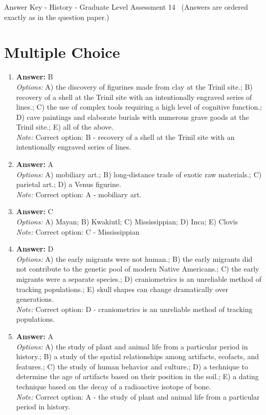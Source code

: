 \documentclass[12pt]{article}
\begin{document}
\begin{center}
Answer Key - History - Graduate Level Assessment 14 \
\small (Answers are ordered exactly as in the question paper.)
\end{center}

\section*{Multiple Choice}
\begin{enumerate}[label=\arabic*.]
\item \textbf{Answer:} B
\\ \textit{Options:} A) the discovery of figurines made from clay at the Trinil site.; B) recovery of a shell at the Trinil site with an intentionally engraved series of lines.; C) the use of complex tools requiring a high level of cognitive function.; D) cave paintings and elaborate burials with numerous grave goods at the Trinil site.; E) all of the above.
\\ \textit{Note:} Correct option: B - recovery of a shell at the Trinil site with an intentionally engraved series of lines.
\item \textbf{Answer:} A
\\ \textit{Options:} A) mobiliary art.; B) long-distance trade of exotic raw materials.; C) parietal art.; D) a Venus figurine.
\\ \textit{Note:} Correct option: A - mobiliary art.
\item \textbf{Answer:} C
\\ \textit{Options:} A) Mayan; B) Kwakiutl; C) Mississippian; D) Inca; E) Clovis
\\ \textit{Note:} Correct option: C - Mississippian
\item \textbf{Answer:} D
\\ \textit{Options:} A) the early migrants were not human.; B) the early migrants did not contribute to the genetic pool of modern Native Americans.; C) the early migrants were a separate species.; D) craniometrics is an unreliable method of tracking populations.; E) skull shapes can change dramatically over generations.
\\ \textit{Note:} Correct option: D - craniometrics is an unreliable method of tracking populations.
\item \textbf{Answer:} A
\\ \textit{Options:} A) the study of plant and animal life from a particular period in history.; B) a study of the spatial relationships among artifacts, ecofacts, and features.; C) the study of human behavior and culture.; D) a technique to determine the age of artifacts based on their position in the soil.; E) a dating technique based on the decay of a radioactive isotope of bone.
\\ \textit{Note:} Correct option: A - the study of plant and animal life from a particular period in history.
\end{enumerate}
\end{document}
